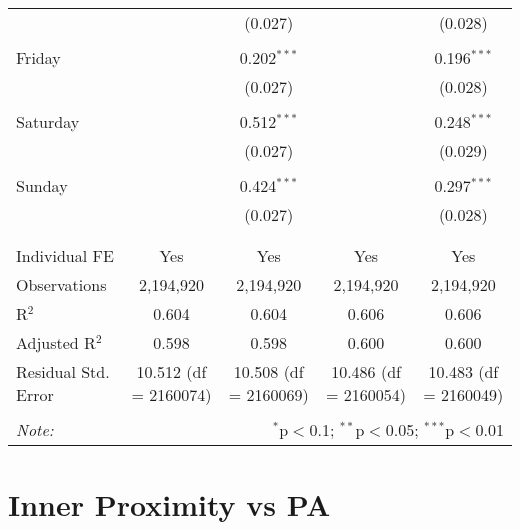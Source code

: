 \documentclass[
]{article}
\begin{document}
\begin{table}[!htbp]
{\begin{tabular}{@{\extracolsep{5pt}}lcccc}
  &  & (0.027) &  & (0.028) \\ 
  & & & & \\ 
 Friday &  & 0.202$^{***}$ &  & 0.196$^{***}$ \\ 
  &  & (0.027) &  & (0.028) \\ 
  & & & & \\ 
 Saturday &  & 0.512$^{***}$ &  & 0.248$^{***}$ \\ 
  &  & (0.027) &  & (0.029) \\ 
  & & & & \\ 
 Sunday &  & 0.424$^{***}$ &  & 0.297$^{***}$ \\ 
  &  & (0.027) &  & (0.028) \\ 
  & & & & \\ 
\hline \\[-1.8ex] 
Individual FE & Yes & Yes & Yes & Yes \\ 
Observations & 2,194,920 & 2,194,920 & 2,194,920 & 2,194,920 \\ 
R$^{2}$ & 0.604 & 0.604 & 0.606 & 0.606 \\ 
Adjusted R$^{2}$ & 0.598 & 0.598 & 0.600 & 0.600 \\ 
Residual Std. Error & 10.512 (df = 2160074) & 10.508 (df = 2160069) & 10.486 (df = 2160054) & 10.483 (df = 2160049) \\ 
\hline 
\hline \\[-1.8ex] 
\textit{Note:}  & \multicolumn{4}{r}{$^{*}$p$<$0.1; $^{**}$p$<$0.05; $^{***}$p$<$0.01} \\ 
\end{tabular}
} 
\end{table} 
\newpage
\section{Inner Proximity vs PA}
\end{document}
